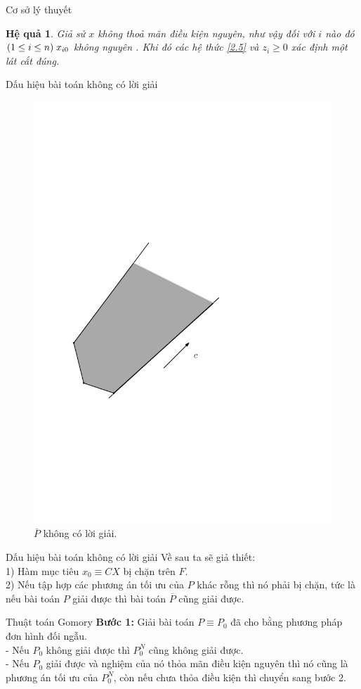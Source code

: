 \documentclass[10pt]{beamer}
\newtheorem{hq}{Hệ quả}[section]
\begin{document}
    \begin{frame}{Cơ sở lý thuyết}
        \begin{hq}
        Giả sử $x$ không thoả mãn điều kiện nguyên, như vậy đối 
với $i$ nào đó $(1\le i \le n) \hspace{0.1cm} x_{i0}$ không nguyên . Khi đó các hệ thức \eqref{2.5}  và $z_i \ge 0$ xác định một lát cắt đúng.
    \end{hq} 
    \end{frame}

\begin{frame}{Dấu hiệu bài toán không có lời giải}
\begin{figure}[h]
    \centering
    \includegraphics[width=0.45\linewidth]{anh3.pdf}
    \caption{$\overline{P}$ không có lời giải.}
\end{figure}
    \end{frame}

    \begin{frame}{Dấu hiệu bài toán không có lời giải}
        Về sau ta sẽ giả thiết:\\
1) Hàm mục tiêu $x_0\equiv CX$ bị chặn trên $F$.\\
2) Nếu tập hợp các phương án tối ưu của $P$ khác rỗng thì nó phải bị chặn, tức là nếu bài toán $P$ giải được thì bài toán $\overline{P}$ cũng giải 
được.\\
    \end{frame}

    \begin{frame}{Thuật toán Gomory}
        \textbf{Bước 1:}
Giải bài toán $P\equiv P_0$ đã cho bằng phương pháp đơn hình đối ngẫu.\\
- Nếu $P_0$ không giải được thì $P_0^N$ cũng không giải được.\\
- Nếu  $P_0$ giải được và nghiệm của nó thỏa mãn điều kiện nguyên thì nó cũng là phương án tối ưu của $P^N_0$, còn nếu chưa thỏa điều kiện thì chuyển sang bước 2.\\
       
    \end{frame}
\end{document}
